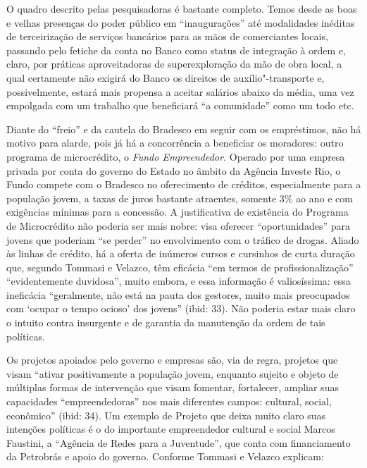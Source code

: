 O quadro descrito pelas pesquisadoras é bastante completo. Temos desde
as boas e velhas presenças do poder público em ``inaugurações'' até
modalidades inéditas de terceirização de serviços bancários para as mãos
de comerciantes locais, passando pelo fetiche da conta no Banco como
status de integração à ordem e, claro, por práticas aproveitadoras de
superexploração da mão de obra local, a qual certamente não exigirá do
Banco os direitos de auxílio"-transporte e, possivelmente, estará mais
propensa a aceitar salários abaixo da média, uma vez empolgada com um
trabalho que beneficiará ``a comunidade'' como um todo etc.

Diante do ``freio'' e da cautela do Bradesco em seguir com os
empréstimos, não há motivo para alarde, pois já há a concorrência a
beneficiar os moradores: outro programa de microcrédito, o \emph{Fundo
 Empreendedor.} Operado por uma empresa privada por conta do governo
do Estado no âmbito da Agência Investe Rio, o Fundo compete com o
Bradesco no oferecimento de créditos, especialmente para a população
jovem, a taxas de juros bastante atraentes, somente 3\% ao ano e com
exigências mínimas para a concessão. A justificativa de existência do
Programa de Microcrédito não poderia ser mais nobre: visa oferecer
``oportunidades'' para jovens que poderiam ``se perder'' no envolvimento
com o tráfico de drogas. Aliado às linhas de crédito, há a oferta de
inúmeros cursos e cursinhos de curta duração que, segundo Tommasi e
Velazco, têm eficácia ``em termos de profissionalização''
``evidentemente duvidosa'', muito embora, e essa informação é
valiosíssima: essa ineficácia ``geralmente, não está na pauta dos
gestores, muito mais preocupados com `ocupar o tempo ocioso' dos
jovens'' (ibid: 33). Não poderia estar mais claro o intuito contra
insurgente e de garantia da manutenção da ordem de tais políticas.

Os projetos apoiados pelo governo e empresas são, via de regra, projetos
que visam ``ativar positivamente a população jovem, enquanto sujeito e
objeto de múltiplas formas de intervenção que visam fomentar,
fortalecer, ampliar suas capacidades ``empreendedoras'' nos mais
diferentes campos: cultural, social, econômico'' (ibid: 34). Um exemplo
de Projeto que deixa muito claro suas intenções políticas é o do
importante empreendedor cultural e social Marcos Faustini, a ``Agência
de Redes para a Juventude'', que conta com financiamento da Petrobrás e
apoio do governo. Conforme Tommasi e Velazco explicam:

